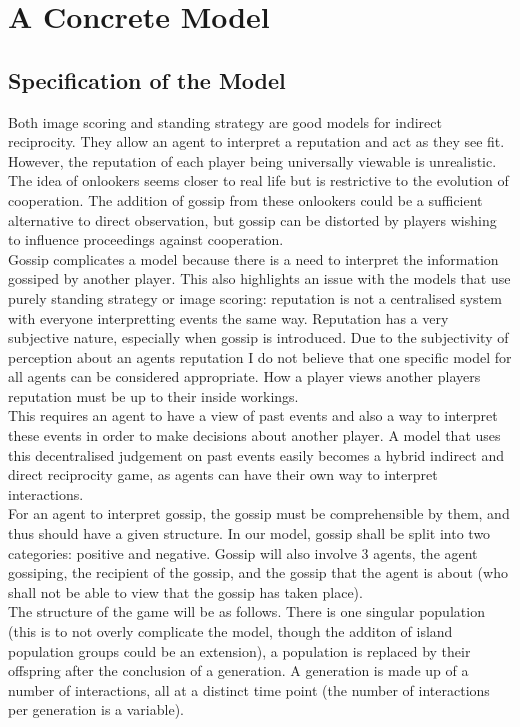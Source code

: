\documentclass[twoside,twocolumn]{article}
\begin{document}

\section{A Concrete Model}
\subsection{Specification of the Model}
Both image scoring and standing strategy are good models for indirect reciprocity. They allow an agent to interpret a reputation and act as they see fit. However, the reputation of each player being universally viewable is unrealistic. The idea of onlookers seems closer to real life but is restrictive to the evolution of cooperation. The addition of gossip from these onlookers could be a sufficient alternative to direct observation, but gossip can be distorted by players wishing to influence proceedings against cooperation.\\
Gossip complicates a model because there is a need to interpret the information gossiped by another player. This also highlights an issue with the models that use purely standing strategy or image scoring: reputation is not a centralised system with everyone interpretting events the same way. Reputation has a very subjective nature, especially when gossip is introduced. Due to the subjectivity of perception about an agents reputation I do not believe that one specific model for all agents can be considered appropriate. How a player views another players reputation must be up to their inside workings.\\
This requires an agent to have a view of past events and also a way to interpret these events in order to make decisions about another player. A model that uses this decentralised judgement on past events easily becomes a hybrid indirect and direct reciprocity game, as agents can have their own way to interpret interactions.\\
For an agent to interpret gossip, the gossip must be comprehensible by them, and thus should have a given structure. In our model, gossip shall be split into two categories: positive and negative. Gossip will also involve 3 agents, the agent gossiping, the recipient of the gossip, and the gossip that the agent is about (who shall not be able to view that the gossip has taken place).\\
The structure of the game will be as follows. There is one singular population (this is to not overly complicate the model, though the additon of island population groups could be an extension), a population is replaced by their offspring after the conclusion of a generation. A generation is made up of a number of interactions, all at a distinct time point (the number of interactions per generation is a variable).\\
\end{document}
